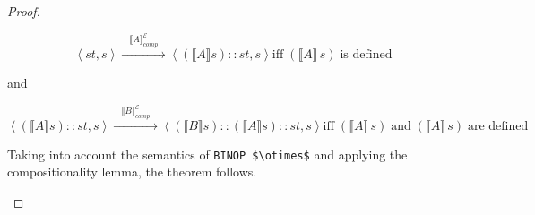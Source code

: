 \documentclass{article}
\def\transarrow{\xrightarrow}
\def\padding{\phantom{X}}
\newcommand{\trans}[3]{{#1}\transarrow{\padding#2\padding}{#3}}
\newcommand{\llang}[1]{\mbox{\lstinline[mathescape]|#1|}}
\newcommand{\inbr}[1]{\left<{#1}\right>}
\newcommand{\sembr}[1]{\llbracket{#1}\rrbracket}
\theoremstyle{definition}
\begin{document}
\begin{proof}
\begin{itemize}
      \[
        \trans{\inbr{st, s}}{\sembr{A}^{\mathscr E}_{comp}}{\inbr{(\sembr{A}s)::st, s}} \mbox{iff} \; (\sembr{A}\,s)\; \mbox{is defined}
      \]

      and

      \[
        \trans{\inbr{(\sembr{A}s)::st, s}}{\sembr{B}^{\mathscr E}_{comp}}{\inbr{(\sembr{B}s)::(\sembr{A}s)::st, s}} \mbox{iff} \; (\sembr{A}\,s) \;\mbox{and}\; (\sembr{A}\,s) \; \mbox{are defined}
      \]

      Taking into account the semantics of \llang{BINOP $\otimes$} and applying the compositionality lemma, the theorem follows.
  \end{itemize}
\end{proof}
\end{document}
